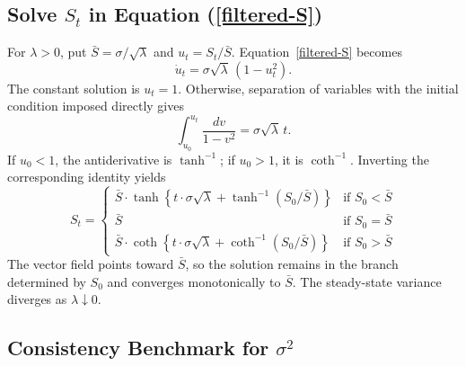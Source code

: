 \documentclass[mnsc]{informs3}
\begin{document}
\begin{APPENDICES}
\subsection{Solve $S_t$ in Equation (\ref{filtered-S})}\label{app-S-equ}

For $\lambda>0$, put $\bar S=\sigma/\sqrt\lambda$ and
$u_t=S_t/\bar S$. Equation~\eqref{filtered-S} becomes
\[
\dot u_t=\sigma\sqrt\lambda\,(1-u_t^2).
\]
The constant solution is $u_t=1$. Otherwise, separation of variables
with the initial condition imposed directly gives
\[
\int_{u_0}^{u_t}\frac{dv}{1-v^2}=\sigma\sqrt\lambda\,t.
\]
If $u_0<1$, the antiderivative is $\tanh^{-1}$; if $u_0>1$, it is
$\coth^{-1}$. Inverting the corresponding identity yields
\begin{equation*}
	S_t =
	\begin{cases}
        \bar{S} \cdot \tanh\left\{t\cdot\sigma\sqrt{\lambda} +  \tanh^{-1}\left(S_0\big/\bar{S}\right)\right\} & \text{if } S_0 < \bar{S} \\
        \bar{S} & \text{if } S_0 = \bar{S} \\
        \bar{S} \cdot \coth\left\{t\cdot\sigma\sqrt{\lambda} +  \coth^{-1}\left(S_0\big/\bar{S}\right)\right\} & \text{if } S_0 > \bar{S}
	\end{cases}
\end{equation*}
The vector field points toward $\bar S$, so the solution remains in the
branch determined by $S_0$ and converges monotonically to $\bar S$.
The steady-state variance diverges as $\lambda\downarrow0$.


\subsection{Consistency Benchmark for $\sigma^2$}\label{appexidx-normal-benchmark}


\end{APPENDICES}
\end{document}
